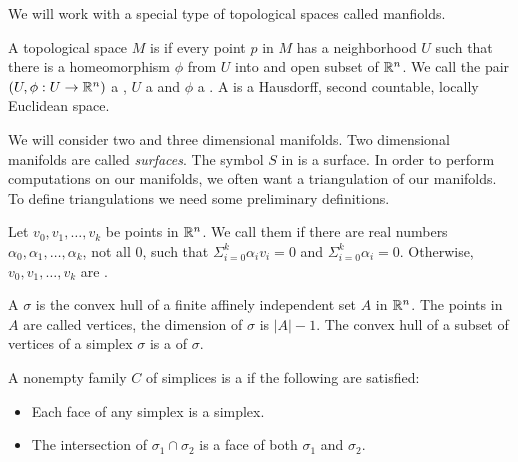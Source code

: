 We will work with a special type of topological spaces called manfiolds.

\begin{definition}
	A topological space $M$ is 
	if every point $p$ in $M$ has a neighborhood $U$ such that there is  a
	homeomorphism  $\phi$ from $U$ into and open  subset of $\mathbb{R}^n$.
	We call the pair $(U,\phi: U\to \mathbb{R}^n)$ a , $U$ a 
	and  $\phi$ a . 
A  is a Hausdorff, second countable, locally Euclidean space.
\end{definition}

We will  consider two and three dimensional manifolds. Two dimensional
manifolds are called \emph{surfaces}.
The symbol $S$ in  is a surface.
In order to perform computations on our manifolds, 
we often want a triangulation of our manifolds.
To define triangulations we need some preliminary definitions.



\begin{definition}
Let $v_0,v_1,\ldots,v_k$ be points in $\mathbb{R}^n$. We call them 
if there are real numbers $\alpha_0,\alpha_1,\ldots,\alpha_k$, not all 0, such that
$\Sigma_{i=0}^k \alpha_iv_i=0$ and $\Sigma_{i=0}^k \alpha_i=0.$
Otherwise,  $v_0,v_1,\ldots,v_k$ are .

\end{definition}

\begin{definition}[Simplices]
A  $\sigma$ is the convex hull of a finite affinely independent
set $A$ in $\mathbb{R}^n$. The points in  $A$ are  called vertices, the dimension
of  $\sigma$ is $|A|-1$.  The convex hull of a subset of vertices of a simplex
$\sigma$ is a  of $\sigma$.
\end{definition}

\begin{definition}
A nonempty family $C$ of simplices is a  if the following
are satisfied:
\begin{itemize}
\item  Each face of any simplex is a simplex.
\item The intersection of $\sigma_1 \cap \sigma_2$ is a face of both $\sigma_1$ and 
$\sigma_2$.
\end{itemize}


\end{definition}

